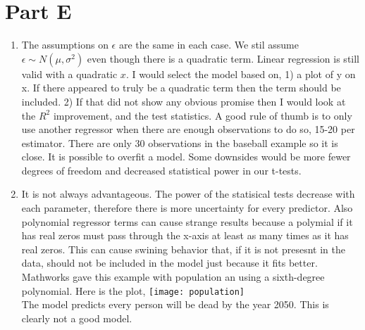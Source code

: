 \documentclass{article}
\begin{document}
\section*{Part E}
\begin{enumerate}
  \item The assumptions on $\epsilon $ are the same in each case. We stil assume $\epsilon \sim N(\mu, \sigma^2)$ even though there is a quadratic term. Linear regression is still valid with a quadratic $x$. I would select the model based on, 1) a plot of y on x. If there appeared to truly be a quadratic term then the term should be included. 2) If that did not show any obvious promise then I would look at the $R^2$ improvement, and the test statistics. A good rule of thumb is to only use another regressor when there are enough observations to do so, 15-20 per estimator. There are only 30 observations in the baseball example so it is close. It is possible to overfit a model. Some downsides would be more fewer degrees of freedom and decreased statistical power in our t-tests. 
  \item It is not always advantageous. The power of the statisical tests decrease with each parameter, therefore there is more uncertainty for every predictor. Also polynomial regressor terms can cause strange results because a polymial if it has real zeros must pass through the x-axis at least as many times as it has real zeros. This can cause swining behavior that, if it is not presesnt in the data, should not be included in the model just because it fits better. Mathworks gave this example with population an using a sixth-degree polynomial. Here is the plot, 
\texttt{[image: population]} \\
The model predicts every person will be dead by the year 2050. This is clearly not a good model. 
\end{enumerate}
\end{document}
